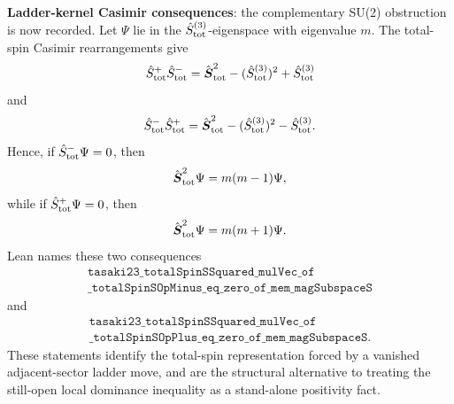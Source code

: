 \documentclass[a4paper,11pt]{article}
\begin{document}
\textbf{Ladder-kernel Casimir consequences}: the complementary
SU(2) obstruction is now recorded.  Let \(\Psi\) lie in the
\(\hat S^{(3)}_{\rm tot}\)-eigenspace with eigenvalue \(m\).  The
total-spin Casimir rearrangements give
\[
  \hat S^+_{\rm tot}\hat S^-_{\rm tot}
  =
  \hat{\boldsymbol S}_{\rm tot}^2
  -(\hat S^{(3)}_{\rm tot})^2
  +\hat S^{(3)}_{\rm tot}
\]
and
\[
  \hat S^-_{\rm tot}\hat S^+_{\rm tot}
  =
  \hat{\boldsymbol S}_{\rm tot}^2
  -(\hat S^{(3)}_{\rm tot})^2
  -\hat S^{(3)}_{\rm tot}.
\]
Hence, if \(\hat S^-_{\rm tot}\Psi=0\), then
\[
  \hat{\boldsymbol S}_{\rm tot}^2\Psi=m(m-1)\Psi,
\]
while if \(\hat S^+_{\rm tot}\Psi=0\), then
\[
  \hat{\boldsymbol S}_{\rm tot}^2\Psi=m(m+1)\Psi.
\]
Lean names these two consequences
\[
\begin{gathered}
\texttt{tasaki23\_totalSpinSSquared\_mulVec\_of}\\
\texttt{\_totalSpinSOpMinus\_eq\_zero\_of\_mem\_magSubspaceS}
\end{gathered}
\]
and
\[
\begin{gathered}
\texttt{tasaki23\_totalSpinSSquared\_mulVec\_of}\\
\texttt{\_totalSpinSOpPlus\_eq\_zero\_of\_mem\_magSubspaceS}.
\end{gathered}
\]
These statements identify the total-spin representation forced by a
vanished adjacent-sector ladder move, and are the structural
alternative to treating the still-open local dominance inequality as a
stand-alone positivity fact.
\end{document}
